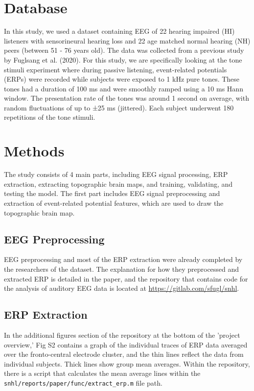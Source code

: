 \documentclass{article}
\begin{document}
\section{Database}
In this study, we used a dataset containing EEG of 22 hearing impaired (HI) listeners with sensorineural hearing loss and 22 age matched normal hearing (NH) peers (between 51 - 76 years old). The data was collected from a previous study by Fuglsang et al. (2020). For this study, we are specifically looking at the tone stimuli experiment where during passive listening, event-related potentials (ERPs) were recorded while subjects were exposed to 1 kHz pure tones. These tones had a duration of 100 ms and were smoothly ramped using a 10 ms Hann window. The presentation rate of the tones was around 1 second on average, with random fluctuations of up to ±25 ms (jittered). Each subject underwent 180 repetitions of the tone stimuli.

\section{Methods}
The study consists of 4 main parts, including EEG signal processing, ERP extraction, extracting topographic brain maps, and training, validating, and testing the model. The first part includes EEG signal preprocessing and extraction of event-related potential features, which are used to draw the topographic brain map. 

\subsection{EEG Preprocessing}
EEG preprocessing and most of the ERP extraction were already completed by the researchers of the dataset. The explanation for how they preprocessed and extracted ERP is detailed in the paper, and the repository that contains code for the analysis of auditory EEG data is located at \url{https://gitlab.com/sfugl/snhl}. 

\subsection{ERP Extraction}
In the additional figures section of the repository at the bottom of the 'project overview,' Fig S2 contains a graph of the individual traces of ERP data averaged over the fronto-central electrode cluster, and the thin lines reflect the data from individual subjects. Thick lines show group mean averages. Within the repository, there is a script that calculates the mean average lines within the \texttt{snhl/reports/paper/func/extract\_erp.m} file path. 
\end{document}
